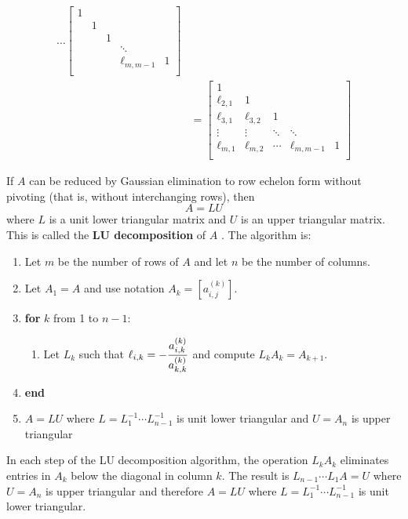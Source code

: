 \begin{proposition}
\begin{enumerate}
\begin{align*}
\dots
\begin{bmatrix}
1 & & & & \\
& 1 & & & \\
& & 1 & & \\
& & & \ddots & \\
& & & \ell_{m,m-1} & 1 \\
\end{bmatrix} \\
&=
\begin{bmatrix}
1 & & & & \\
\ell_{2,1} & 1 & & & \\
\ell_{3,1} & \ell_{3,2} & 1 & & \\
\vdots & \vdots & \ddots & \ddots & \\
\ell_{m,1} & \ell_{m,2} & \cdots & \ell_{m,m-1} & 1 \\
\end{bmatrix}
\end{align*}
\end{enumerate}
\end{proposition}

\begin{theorem}
If $A$ can be reduced by Gaussian elimination to row echelon form without pivoting (that is, without interchanging rows), then
$$A = LU$$
where $L$ is a unit lower triangular matrix and $U$ is an upper triangular matrix. This is called the {\bf LU decomposition} of $A$ \cite[p.68]{MH}. The algorithm is:
\begin{enumerate}
\item[] Let $m$ be the number of rows of $A$ and let $n$ be the number of columns.
\item[] Let $A_1 = A$ and use notation $A_k = \left[ a_{i,j}^{(k)} \right]$.
\item[] {\bf for} $k$ from 1 to $n-1$:
\begin{enumerate}
\item[] Let $L_k$ such that $\displaystyle \ell_{i,k} = - \frac{a^{(k)}_{i,k}}{a^{(k)}_{k,k}}$ and compute $L_k A_k = A_{k+1}$.
\end{enumerate}
\item[] {\bf end}
\item[] $A = LU$ where $L = L_1^{-1} \cdots L_{n-1}^{-1}$ is unit lower triangular and $U = A_n$ is upper triangular
\end{enumerate}
\end{theorem}

\begin{note}
In each step of the LU decomposition algorithm, the operation $L_k A_k$ eliminates entries in $A_k$ below the diagonal in column $k$. The result is $L_{n-1} \cdots L_1 A = U$ where $U = A_n$ is upper triangular and therefore $A = LU$ where $L = L_1^{-1} \cdots L_{n-1}^{-1}$ is unit lower triangular.
\end{note}

